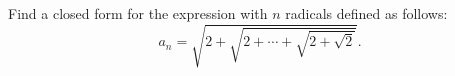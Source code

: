 Find a closed form for the expression with $n$ radicals defined as follows:
\[ a_n = \sqrt{2 + \sqrt{2 + \cdots + \sqrt{2 + \sqrt{2}}}}. \]
